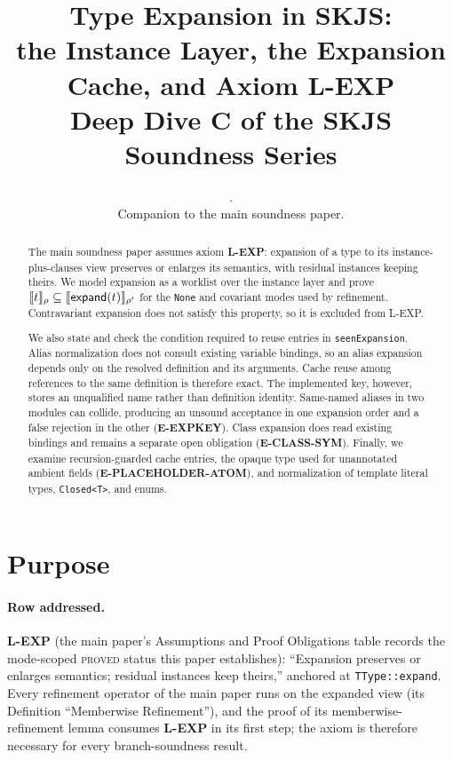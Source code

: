 \documentclass[11pt]{article}
\title{Type Expansion in SKJS:\\
the Instance Layer, the Expansion Cache, and Axiom \textbf{L-EXP}\\
{\large Deep Dive C of the SKJS Soundness Series}}
\author{}
\date{\skjspin.\\
Companion to the main soundness paper.}
\newcommand{\expandop}{\mathsf{expand}}
\begin{document}
\maketitle

\begin{abstract}
The main soundness paper assumes axiom \textbf{L-EXP}: expansion of a type
to its instance-plus-clauses view preserves or enlarges its semantics, with
residual instances keeping theirs. We model expansion as a worklist over the
instance layer and prove
$\sem{t}_\rho \subseteq \sem{\expandop(t)}_{\rho'}$ for the
\texttt{None} and covariant modes used by refinement. Contravariant expansion
does not satisfy this property, so it is excluded from L-EXP.

We also state and check the condition required to reuse entries in
\texttt{seenExpansion}. Alias normalization does not consult existing
variable bindings, so an alias expansion depends only on the resolved
definition and its arguments. Cache reuse among references to the same
definition is therefore exact. The implemented key, however, stores an
unqualified name rather than definition identity. Same-named aliases in two
modules can collide, producing an unsound acceptance in one expansion order
and a false rejection in the other (\textbf{E-EXPKEY}). Class expansion does
read existing bindings and remains a separate open obligation
(\textbf{E-CLASS-SYM}). Finally, we examine recursion-guarded cache entries,
the opaque type used for unannotated ambient fields
(\textbf{E-PLACEHOLDER-ATOM}), and normalization of template literal types,
\texttt{Closed<T>}, and enums.
\end{abstract}

\tableofcontents

\section{Purpose}
\label{sec:purpose}

\paragraph{Row addressed.}
\textbf{L-EXP} (the main paper's Assumptions and
Proof Obligations table records the mode-scoped \textsc{proved} status
this paper establishes): ``Expansion preserves or enlarges semantics;
residual instances keep theirs,'' anchored at \texttt{TType::expand}. Every
refinement operator of the main paper runs on the expanded view
(its Definition ``Memberwise Refinement''), and the proof of its
memberwise-refinement lemma consumes \textbf{L-EXP} in its first step; the
axiom is therefore necessary for every branch-soundness result.
\end{document}
